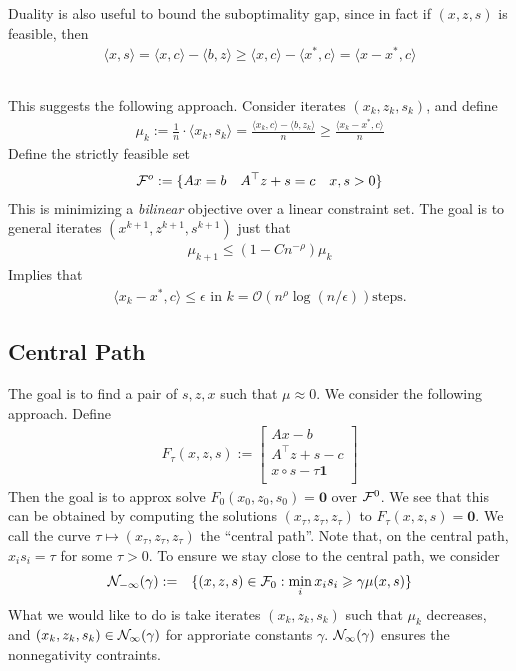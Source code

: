 Duality is also useful to bound the suboptimality gap, since in fact if $(x,z,s)$ is feasible, then
\begin{eqnarray}
\langle x, s \rangle = \langle x, c \rangle - \langle b,z \rangle \ge \langle x,c \rangle - \langle x^*, c \rangle = \langle x - x^* , c \rangle
\end{eqnarray}

\subsection{}
This suggests the following approach. Consider iterates $(x_k,z_k,s_k)$, and define
\begin{eqnarray}
\mu_k := \frac{1}{n}\cdot \langle x_k, s_k \rangle = \frac{\langle x_k, c \rangle - \langle b,z_k \rangle}{n} \ge \frac{\langle x_k-x^* , c \rangle}{n}
\end{eqnarray}
Define the strictly feasible set
\begin{eqnarray}
{\cal F}^o := \{Ax = b \quad A^{\top} z + s = c \quad x,s  > 0\}
\end{eqnarray}
This is minimizing a \emph{bilinear} objective over a linear constraint set. The goal is to general iterates $(x^{k+1},z^{k+1},s^{k+1})$ just that 
\begin{eqnarray}
\mu_{k+1} \le (1 - Cn^{-\rho})\mu_k
\end{eqnarray}
Implies that 
\begin{eqnarray}
\langle x_k - x^*, c \rangle \le \epsilon \text{ in } k = \mathcal{O}\left(n^{\rho}\log (n/\epsilon)\right) \text{steps}.
\end{eqnarray}
\subsection{Central Path}

The goal is to find a pair of $s,z,x$ such that $\mu \approx 0$. We consider the following approach. Define
\begin{eqnarray}
F_{\tau}(x,z,s) := \begin{bmatrix} Ax - b \\
A^\top z + s - c \\
x \circ s - \tau \mathbf{1} \\
\end{bmatrix}
\end{eqnarray}
Then the goal is to approx solve $F_0(x_0,z_0,s_0) = \mathbf{0}$ over ${\cal F}^0$. We see that this can be obtained by computing the solutions $(x_\tau,z_\tau,z_\tau)$ to $F_{\tau}(x,z,s) = \mathbf{0}$. We call the curve $\tau \mapsto (x_\tau,z_\tau,z_\tau)$ the ``central path''. Note that, on the central path, $x_i s_i = \tau$ for some $\tau > 0$. To ensure we stay close to the central path, we consider
\begin{eqnarray*}
{\cal N}_{-\infty}(\gamma) &:=& \{(x,z,s) \in {\cal F}_0: \min_i x_is_i \geqslant \gamma \mu(x,s)\}\\
\end{eqnarray*} 
What we would like to do is take iterates $(x_k,z_k,s_k)$ such that $\mu_k$ decreases, and $(x_k,z_k,s_k) \in  {\cal N}_{\infty}(\gamma)$ for approriate constants $\gamma$. ${\cal N}_{\infty}(\gamma)$ ensures the nonnegativity contraints.


